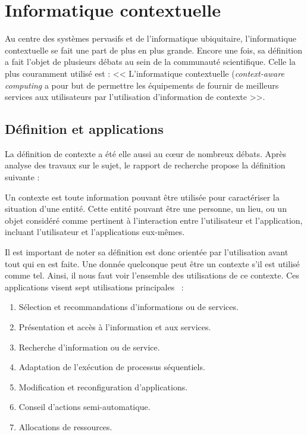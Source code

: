 \section{Informatique contextuelle}\label{sec:rw:supervision:contexte}
Au centre des systèmes pervasifs et de l'informatique ubiquitaire, l'informatique contextuelle se fait une part de plus en plus grande. Encore une fois, sa définition a fait l'objet de plusieurs débats au sein de la communauté scientifique. Celle la plus couramment utilisé est : << L'informatique contextuelle (\textit{context-aware computing} a pour but de permettre les équipements de fournir de meilleurs services aux utilisateurs par l'utilisation d'information de contexte >>\cite{Han:contextaware}.

\subsection{Définition et applications}
La définition de contexte a été elle aussi au cœur de nombreux débats. Après analyse des travaux sur le sujet, le rapport de recherche \cite{Dey:context} propose la définition suivante :

\begin{defi}[Contexte]
Un contexte est toute information pouvant être utilisée pour caractériser la situation d'une entité. Cette entité pouvant être une personne, un lieu, ou un objet considéré comme pertinent à l'interaction entre l'utilisateur et l'application, incluant l'utilisateur et l'applications eux-mêmes.
\end{defi}

Il est important de noter sa définition est donc orientée par l'utilisation avant tout qui en est faite. Une donnée quelconque peut être un contexte s'il est utilisé comme tel. Ainsi, il nous faut voir l'ensemble des utilisations de ce contexte. Ces applications visent sept utilisations principales~\cite{Soylu:context} : 
\begin{enumerate}
	\item Sélection et recommandations d'informations ou de services.
	\item Présentation et accès à l'information et aux services.
	\item Recherche d'information ou de service.
	\item Adaptation de l'exécution de processus séquentiels.
	\item Modification et reconfiguration d'applications.
	\item Conseil d'actions semi-automatique.
	\item Allocations de ressources.
\end{enumerate}

